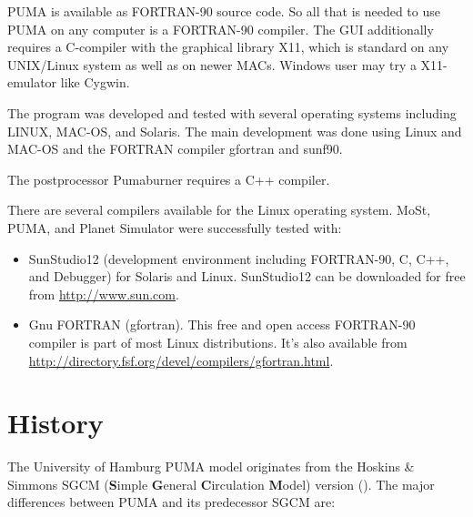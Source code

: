    PUMA is available as FORTRAN-90 source code. So all that is needed
   to use PUMA on any computer is a FORTRAN-90 compiler.
   The GUI additionally requires a C-compiler with the graphical
   library X11, which is standard on any UNIX/Linux system
   as well as on newer MACs.
   Windows user may try a X11-emulator like Cygwin.

   The program was developed and tested with several operating systems
   including LINUX, MAC-OS, and Solaris. The main development was done
   using Linux and MAC-OS and the FORTRAN compiler gfortran and sunf90.

   The postprocessor Pumaburner requires a C++ compiler.

   There are several compilers available for the Linux operating system.
   MoSt, PUMA, and Planet Simulator were successfully tested with:

\begin{itemize}
\item SunStudio12 (development environment including
   FORTRAN-90, C, C++, and Debugger) for Solaris and Linux.
   SunStudio12 can be downloaded for free from {\url{http://www.sun.com}}.
\item Gnu FORTRAN (gfortran).
   This free and open access FORTRAN-90 compiler is part of most
   Linux distributions.
   It's also available from
   {\url{http://directory.fsf.org/devel/compilers/gfortran.html}}.
\end{itemize}




\section{History}
    
    The University of Hamburg PUMA model originates from
     the Hoskins \& Simmons SGCM ({\bf S}imple {\bf G}eneral {\bf C}irculation {\bf M}odel)
     version (\citep{hossim75}). The major differences between PUMA
     and its predecessor SGCM are:

